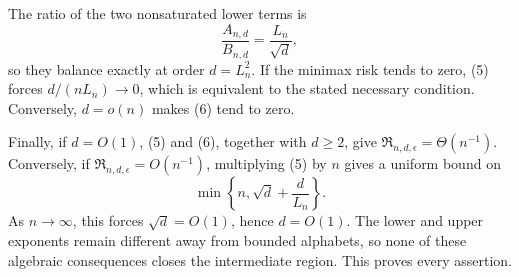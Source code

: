 The ratio of the two nonsaturated lower terms is
\[
 \frac{A_{n,d}}{B_{n,d}}=\frac{L_n}{\sqrt d},
\]
so they balance exactly at order \(d=L_n^2\).  If the minimax risk tends to zero, (5) forces
\(d/(nL_n)\to0\), which is equivalent to the stated necessary condition.  Conversely, \(d=o(n)\) makes (6) tend to zero.

Finally, if \(d=O(1)\), (5) and (6), together with \(d\geq2\), give
\(\mathfrak R_{n,d,\epsilon}=\Theta(n^{-1})\).  Conversely, if
\(\mathfrak R_{n,d,\epsilon}=O(n^{-1})\), multiplying (5) by \(n\) gives a uniform bound on
\[
 \min\!\left\{n,\sqrt d+\frac d{L_n}\right\}.
\]
As \(n\to\infty\), this forces \(\sqrt d=O(1)\), hence \(d=O(1)\).  The lower and upper exponents remain different away from bounded alphabets, so none of these algebraic consequences closes the intermediate region.  This proves every assertion.